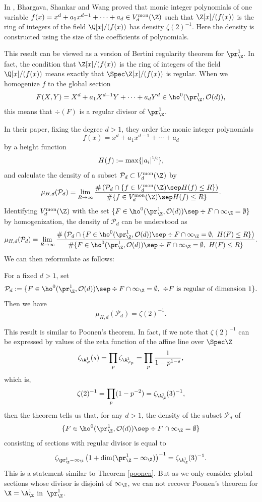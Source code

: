 In \cite{BSW16}, Bhargava, Shankar and Wang proved that monic integer polynomials of one variable $f(x)=x^d+a_1x^{d-1}+\cdots+a_d\in V^{\mathrm{mon}}_d(\Z)$ such that $\Z[x]/(f(x))$ is the ring of integers of the field $\Q[x]/(f(x))$ has density $\zeta(2)^{-1}$. Here the density is constructed using the size of the coefficients of polynomials.

This result can be viewed as a version of Bertini regularity theorem for $\pr^1_{\Z}$. In fact, the condition that $\Z[x]/(f(x))$ is the ring of integers of the field $\Q[x]/(f(x))$ means exactly that
$\Spec \Z[x]/(f(x))$ is regular. When we homogenize $f$ to the global section
\[
F(X,Y)=X^d+a_1X^{d-1}Y+\cdots+ a_dY^d\in \ho^0(\pr^1_{\Z}, \mathcal{O}(d)),
\]
this means that $\div (F)$ is a regular divisor of $\pr^1_{\Z}$.

In their paper, fixing the degree $d>1$, they order the monic integer polynomials
\[
f(x)=x^d+a_1x^{d-1}+\cdots+a_d
\]
by a height function
\[
H(f):=\max\{ |a_i|^{\sfrac{1}{i}} \},
\]
and calculate the density of a subset $\mathcal{P}_d\subset V^{\mathrm{mon}}_d(\Z)$ by
\[
\mu_{H,d}(\mathcal{P}_d)=\lim_{R\to \infty} \frac{ \#\left(\mathcal{P}_d\cap \{ f\in V^{\mathrm{mon}}_d(\Z)\sep H(f)\leq R \} \right)}{\#\{ f\in V^{\mathrm{mon}}_d(\Z)\sep H(f)\leq R \}}.
\]
Identifying $V^{\mathrm{mon}}_d(\Z)$ with the set $\{ F\in \ho^0(\pr^1_{\Z}, \mathcal{O}(d))\sep \div F\cap \infty_{\Z}=\emptyset \}$ by homogenization, the density of
$\mathcal{P}_d$ can be understood as
\[
\mu_{H,d}(\mathcal{P}_d)=\lim_{R\to \infty} \frac{ \#\left(\mathcal{P}_d\cap \{ F\in \ho^0(\pr^1_{\Z}, \mathcal{O}(d))\sep \div F\cap \infty_{\Z}=\emptyset,\ H(F)\leq R \} \right)}{\#\{ F\in \ho^0(\pr^1_{\Z}, \mathcal{O}(d))\sep \div F\cap \infty_{\Z}=\emptyset,\ H(F)\leq R \}}.
\]
We can then reformulate \cite[Th.\,1.2]{BSW16} as follows:
\begin{thm}
For a fixed $d>1$, set
\[
\mathcal{P}_d:=\{ F\in \ho^0(\pr^1_{\Z}, \mathcal{O}(d))\sep \div F\cap \infty_{\Z}=\emptyset,\ \div F \text{ is regular of dimension }1 \}.
\]
Then we have
\[
\mu_{H,d}(\mathcal{P}_d)=\zeta(2)^{-1}.
\]
\end{thm}
\begin{rmq}
This result is similar to Poonen's theorem. In fact, if we note that $\zeta(2)^{-1}$ can be expressed by values of the zeta function of the affine line over $\Spec \Z$
\[
\zeta_{\A^1_{\Z}}(s)=\prod_{p}\zeta_{\A^1_{\F_p}}=\prod_{p}\frac{1}{1-p^{1-s}},
\]
which is,
\[
\zeta(2)^{-1}=\prod_p (1-p^{-2})=\zeta_{\A^1_{\Z}}(3)^{-1},
\]
then the theorem tells us that, for any $d>1$, the density of the subset $\mathcal{P}_d$ of
\[
\{ F\in \ho^0(\pr^1_{\Z}, \mathcal{O}(d))\sep \div F\cap \infty_{\Z}=\emptyset \}
\]
consisting of sections with regular divisor is equal to
\[
\zeta_{\pr^1_{\Z}-\infty_{\Z}}\left(1+\dim(\pr^1_{\Z}-\infty_{\Z}) \right)^{-1}=\zeta_{\A^1_{\Z}}(3)^{-1}.
\]
This is a statement similar to Theorem \ref{poonen}. But as we only consider global sections whose divisor is disjoint of $\infty_{\Z}$, we can not recover Poonen's theorem for $\X=\A^1_{\Z}$ in~$\pr^1_{\Z}$.
\end{rmq}


